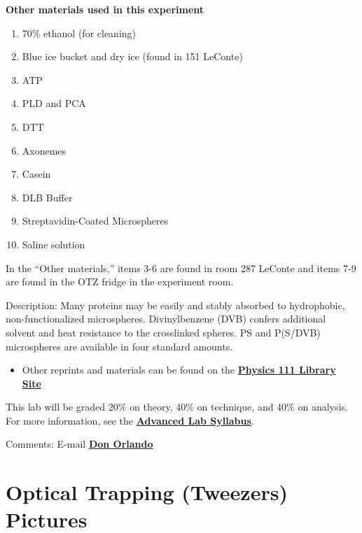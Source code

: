 \documentclass{../lab}
\begin{document}
\textbf{Other materials used in this experiment}

\begin{enumerate}
    \item 70\% ethanol (for cleaning)

    \item Blue ice bucket and dry ice (found in 151 LeConte)

    \item ATP

    \item PLD and PCA

    \item DTT

    \item Axonemes

    \item Casein

    \item DLB Buffer

    \item Streptavidin-Coated Microspheres

    \item Saline solution
\end{enumerate}

In the ``Other materials,'' items 3-6 are found in room 287 LeConte and items 7-9 are found in the OTZ fridge in the experiment room.

Description: Many proteins may be easily and stably absorbed to hydrophobic, non-functionalized microspheres. Divinylbenzene (DVB) confers additional solvent and heat resistance to the crosslinked spheres. PS and P(S/DVB) microspheres are available in four standard amounts.

\begin{itemize}
    \item Other reprints and materials can be found on the \href{http://physics111.lib.berkeley.edu/Physics111/Reprints/OTZ/OTZ\_index.html}{\textbf{Physics 111 Library Site}}
\end{itemize}

This lab will be graded 20\% on theory, 40\% on technique, and 40\% on analysis. For more information, see the \href{\AdvancedLabSyllabus}{\textbf{Advanced Lab Syllabus}}.

Comments: E-mail \href{\MailDonOrlando}{\textbf{Don Orlando}}

\section{Optical Trapping (Tweezers) Pictures}
\end{document}
